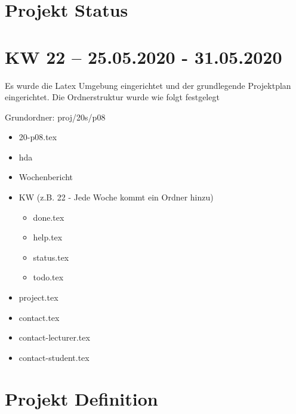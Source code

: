 \documentclass{hda/hdaConceptClass}
\begin{document}
\makesitHead



\chapter{Projekt Status
}\label{chap:status}


\newpage %


\chapter{KW 22 -- 25.05.2020 - 31.05.2020
}\label{chap:kwxn}
Es wurde die Latex Umgebung eingerichtet und der grundlegende Projektplan eingerichtet.
Die Ordnerstruktur wurde wie folgt festgelegt

Grundordner: proj/20s/p08 \newline

\begin{itemize}
  \item 20-p08.tex
  \item hda
  \item Wochenbericht
  \item KW (z.B. 22 - Jede Woche kommt ein Ordner hinzu)
  \begin{itemize}
    \item done.tex
    \item help.tex
    \item status.tex
    \item todo.tex
  \end{itemize}
  \item project.tex
  \item contact.tex
  \item contact-lecturer.tex
  \item contact-student.tex
\end{itemize}



\newpage
\chapter{Projekt Definition
}\label{chap:project}


\newpage


\newpage
\sitAppendix                 %
  \sitListOfTables
  \sitListOfFigures
  \sitListOfListings
  \sitListOfIdxInfos
  
\end{document}
